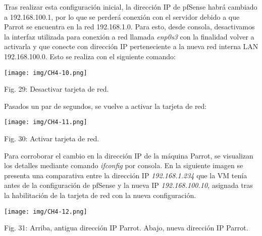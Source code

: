 \documentclass[12pt,oneside,a4paper]{book}
\begin{document}
\hspace{20pt}
Tras realizar esta configuración inicial, la dirección IP de pfSense habrá cambiado a 192.168.100.1, por lo que se perderá conexión con el servidor debido a que Parrot se encuentra en la red 192.168.1.0. Para esto, desde consola, desactivamos la interfaz utilizada para conexión a red llamada \textit{enp0s3} con la finalidad volver a activarla y que conecte con dirección IP perteneciente a la nueva red interna LAN 192.168.100.0. Esto se realiza con el siguiente comando:

\vspace{2em}

\begin{center}
    \texttt{[image: img/CH4-10.png]}
    
\vspace{0.1em}
    
    Fig. 29: Desactivar tarjeta de red.
\end{center}

\vspace{2em}

Pasados un par de segundos, se vuelve a activar la tarjeta de red:

\vspace{2em}

\begin{center}
    \texttt{[image: img/CH4-11.png]}
    
\vspace{0.1em}
    
    Fig. 30: Activar tarjeta de red.
\end{center}

\vspace{2em}

\hspace{20pt}
Para corroborar el cambio en la dirección IP de la máquina Parrot, se visualizan los detalles mediante comando \textit{ifconfig} por consola. En la siguiente imagen se presenta una comparativa entre la dirección IP \textit{192.168.1.234} que la VM tenía antes de la configuración de pfSense y la nueva IP \textit{192.168.100.10}, asignada tras la habilitación de la tarjeta de red con la nueva configuración.

\vspace{2em}

\begin{center}
    \texttt{[image: img/CH4-12.png]}
    
\vspace{0.1em}
    
    Fig. 31: Arriba, antigua dirección IP Parrot. Abajo, nueva dirección IP Parrot.
\end{center}
\end{document}
